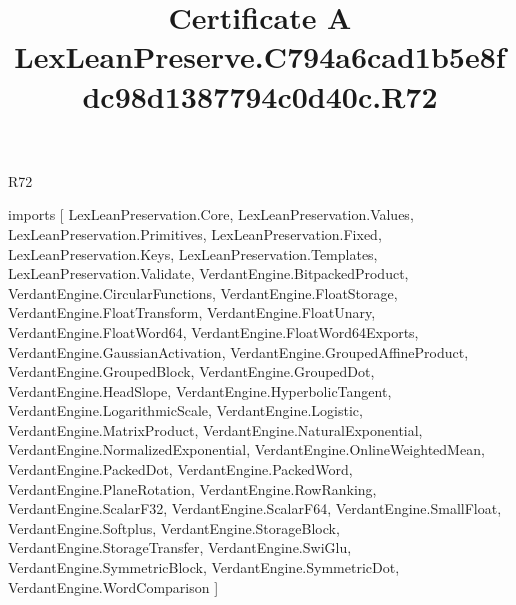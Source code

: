 \begin{lexlean}{R72}
\title{Certificate A LexLeanPreserve.C794a6cad1b5e8fdc98d1387794c0d40c.R72}
\begin{coremodule}
imports [
  LexLeanPreservation.Core,
  LexLeanPreservation.Values,
  LexLeanPreservation.Primitives,
  LexLeanPreservation.Fixed,
  LexLeanPreservation.Keys,
  LexLeanPreservation.Templates,
  LexLeanPreservation.Validate,
  VerdantEngine.BitpackedProduct,
  VerdantEngine.CircularFunctions,
  VerdantEngine.FloatStorage,
  VerdantEngine.FloatTransform,
  VerdantEngine.FloatUnary,
  VerdantEngine.FloatWord64,
  VerdantEngine.FloatWord64Exports,
  VerdantEngine.GaussianActivation,
  VerdantEngine.GroupedAffineProduct,
  VerdantEngine.GroupedBlock,
  VerdantEngine.GroupedDot,
  VerdantEngine.HeadSlope,
  VerdantEngine.HyperbolicTangent,
  VerdantEngine.LogarithmicScale,
  VerdantEngine.Logistic,
  VerdantEngine.MatrixProduct,
  VerdantEngine.NaturalExponential,
  VerdantEngine.NormalizedExponential,
  VerdantEngine.OnlineWeightedMean,
  VerdantEngine.PackedDot,
  VerdantEngine.PackedWord,
  VerdantEngine.PlaneRotation,
  VerdantEngine.RowRanking,
  VerdantEngine.ScalarF32,
  VerdantEngine.ScalarF64,
  VerdantEngine.SmallFloat,
  VerdantEngine.Softplus,
  VerdantEngine.StorageBlock,
  VerdantEngine.StorageTransfer,
  VerdantEngine.SwiGlu,
  VerdantEngine.SymmetricBlock,
  VerdantEngine.SymmetricDot,
  VerdantEngine.WordComparison
]


\end{coremodule}
\end{lexlean}
